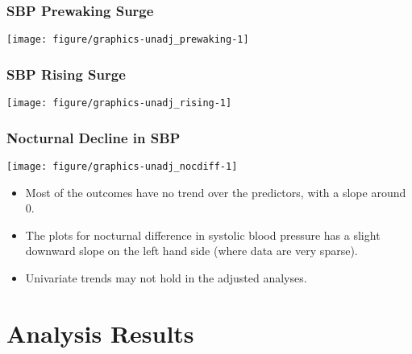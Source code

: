 \documentclass[10pt]{article}\usepackage[]{graphicx}\usepackage[]{color}
\makeatletter
\def\maxwidth{ %
  \ifdim\Gin@nat@width>\linewidth
    \linewidth
  \else
    \Gin@nat@width
  \fi
}
\newenvironment{knitrout}{}{} %
\makeatother
\begin{document}
\subsubsection{SBP Prewaking Surge}
\begin{knitrout}
\color{fgcolor}

{\centering \texttt{[image: figure/graphics-unadj\_prewaking-1]} 

}



\end{knitrout}
\clearpage
\subsubsection{SBP Rising Surge}
\begin{knitrout}
\color{fgcolor}

{\centering \texttt{[image: figure/graphics-unadj\_rising-1]} 

}



\end{knitrout}
\clearpage
\subsubsection{Nocturnal Decline in SBP}
\begin{knitrout}
\color{fgcolor}

{\centering \texttt{[image: figure/graphics-unadj\_nocdiff-1]} 

}



\end{knitrout}

\begin{itemize}
  \item Most of the outcomes have no trend over the predictors, with a slope around 0.
  \item The plots for nocturnal difference in systolic blood pressure has a slight downward slope on the left hand side (where data are very sparse). 
  \item Univariate trends may not hold in the adjusted analyses.
\end{itemize}



\clearpage

\section{Analysis Results}
\end{document}

